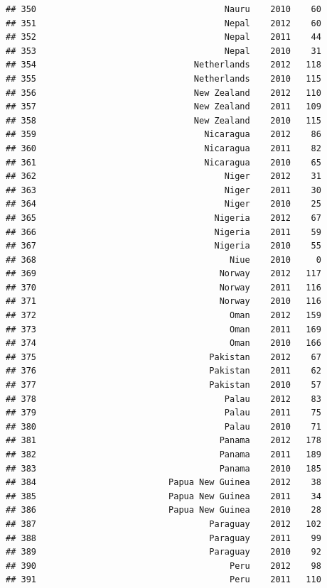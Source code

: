 \documentclass[
]{book}
\begin{document}
\begin{verbatim}
## 350                                     Nauru    2010    60
## 351                                     Nepal    2012    60
## 352                                     Nepal    2011    44
## 353                                     Nepal    2010    31
## 354                               Netherlands    2012   118
## 355                               Netherlands    2010   115
## 356                               New Zealand    2012   110
## 357                               New Zealand    2011   109
## 358                               New Zealand    2010   115
## 359                                 Nicaragua    2012    86
## 360                                 Nicaragua    2011    82
## 361                                 Nicaragua    2010    65
## 362                                     Niger    2012    31
## 363                                     Niger    2011    30
## 364                                     Niger    2010    25
## 365                                   Nigeria    2012    67
## 366                                   Nigeria    2011    59
## 367                                   Nigeria    2010    55
## 368                                      Niue    2010     0
## 369                                    Norway    2012   117
## 370                                    Norway    2011   116
## 371                                    Norway    2010   116
## 372                                      Oman    2012   159
## 373                                      Oman    2011   169
## 374                                      Oman    2010   166
## 375                                  Pakistan    2012    67
## 376                                  Pakistan    2011    62
## 377                                  Pakistan    2010    57
## 378                                     Palau    2012    83
## 379                                     Palau    2011    75
## 380                                     Palau    2010    71
## 381                                    Panama    2012   178
## 382                                    Panama    2011   189
## 383                                    Panama    2010   185
## 384                          Papua New Guinea    2012    38
## 385                          Papua New Guinea    2011    34
## 386                          Papua New Guinea    2010    28
## 387                                  Paraguay    2012   102
## 388                                  Paraguay    2011    99
## 389                                  Paraguay    2010    92
## 390                                      Peru    2012    98
## 391                                      Peru    2011   110

\end{verbatim}
\end{document}
